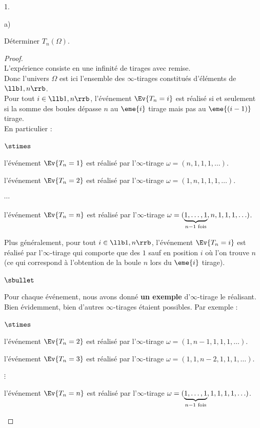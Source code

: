 \begin{noliste}{1.}

\item \begin{noliste}{a)}
  \item Déterminer $T_n(\Omega)$.
    
    \begin{proof}~\\
      L'expérience consiste en une infinité de tirages avec 
      remise. \\
      Donc l'univers $\Omega$ est ici l'ensemble des 
      $\infty$-tirages constitués d'éléments de $\llb 1,n\rrb$.\\
      Pour tout $i\in \llb 1, n\rrb$, l'événement 
      $\Ev{T_n=i}$ est réalisé si et seulement si la somme des boules 
      dépasse $n$ au $\eme{i}$ tirage mais pas au $\eme{(i-1)}$ 
      tirage.\\
      En particulier :
      \begin{noliste}{$\stimes$}
      \item l'événement $\Ev{T_n=1}$ est réalisé par l'$\infty$-tirage
        $\omega=(n,1,1,1,\hdots)$.
      \item l'événement $\Ev{T_n=2}$ est réalisé par l'$\infty$-tirage
        $\omega=(1,n,1,1,1,\hdots)$.
      \item $\cdots$
      \item l'événement $\Ev{T_n=n}$ est réalisé par l'$\infty$-tirage
        $\omega=(\underbrace{1,\hdots,1}_{\scriptsize{n-1 \mbox{ 
              fois}}},n,1,1,1,\hdots)$.
      \end{noliste}
      Plus généralement, pour tout $i\in \llb 1, n\rrb$, l'événement
      $\Ev{T_n=i}$ est réalisé par l'$\infty$-tirage qui comporte que
      des $1$ sauf en position $i$ où l'on trouve $n$(ce qui
      correspond à l'obtention de la boule $n$ lors du $\eme{i}$
      tirage).%
      
      \begin{remark}
	\begin{noliste}{$\sbullet$}
        \item Pour chaque événement, nous avons donné {\bf un 
            exemple} d'$\infty$-tirage le réalisant.\\
	  Bien évidemment, bien d'autres $\infty$-tirages étaient 
	  possibles. Par exemple :
	  \begin{noliste}{$\stimes$}
          \item l'événement $\Ev{T_n=2}$ est réalisé par 
	    l'$\infty$-tirage $\omega=(1,n-1,1,1,1,\hdots)$.
          \item l'événement $\Ev{T_n=3}$ est réalisé par 
	    l'$\infty$-tirage $\omega=(1,1,n-2,1,1,1,\hdots)$.
          \item $\vdots$
          \item l'événement $\Ev{T_n=n}$ est réalisé par
            l'$\infty$-tirage
            $\omega=(\underbrace{1,\hdots,1}_{\scriptsize{n-1 \mbox{
                  fois}}},1,1,1,1,\hdots)$.
	  \end{noliste}
	  

\end{noliste}
\end{remark}
\end{proof}
\end{noliste}
\end{noliste}

